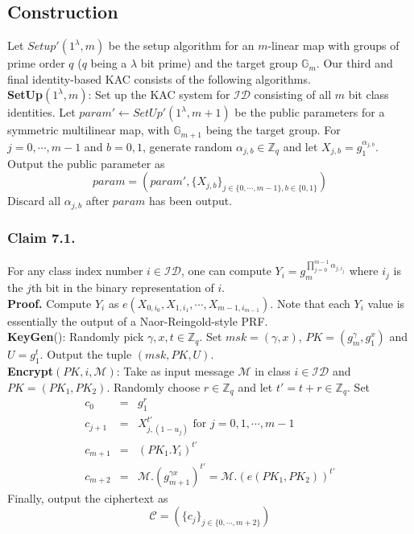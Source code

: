 \subsection{Construction}
\label{subsec:construction_third}

Let $Setup'(1^\lambda,m)$ be the setup algorithm for an $m$-linear map with groups of prime order $q$ ($q$ being a $\lambda$ bit prime) and the target group $\mathbb{G}_{m}$. Our third and final identity-based KAC consists of the following algorithms.\\

\noindent\textbf{SetUp}$(1^{\lambda},m)$: Set up the KAC system for $\mathcal{ID}$ consisting of all $m$ bit class identities. Let $param'\leftarrow SetUp'(1^{\lambda},m+1)$ be the public parameters for a symmetric multilinear map, with $\mathbb{G}_{m+1}$ being the target group. For $j=0,\cdots,m-1$ and $b=0,1$, generate random $\alpha_{j,b}\in\mathbb{Z}_q$ and let $X_{j,b}=g^{\alpha_{j,b}}_1$. Output the public parameter as
\begin{equation}
 param = (param',\{X_{j,b}\}_{j\in\{0,\cdots,m-1\},b\in\{0,1\}})\nonumber
\end{equation}
\noindent Discard all $\alpha_{j,b}$ after $param$ has been output. 

\subsubsection{Claim 7.1.} For any class index number $i\in\mathcal{ID}$, one can compute $Y_i=g^{\prod_{j=0}^{m-1}\alpha_{j,i_j}}_m$ where $i_j$ is the $j$th bit in the binary representation of $i$.\\

\noindent \textbf{Proof.} Compute $Y_i$ as $e(X_{0,i_0},X_{1,i_1},\cdots,X_{m-1,i_{m-1}})$. Note that each $Y_i$ value is essentially the output of a Naor-Reingold-style PRF.\\

\noindent \textbf{KeyGen}(): Randomly pick $\gamma,x,t \in \mathbb{Z}_q$. Set $msk=(\gamma,x)$, $PK=(g^{\gamma}_{m},g^{x}_1)$ and $U=g^{t}_{1}$. Output the tuple $(msk,PK,U)$.\\

\noindent \textbf{Encrypt}$(PK,i,\mathcal{M})$: Take as input message $\mathcal{M}$ in class $i \in \mathcal{ID}$ and $PK=(PK_1,PK_2)$. Randomly choose $r\in\mathbb{Z}_q$ and let $t'=t+r \in\mathbb{Z}_q$. Set
\begin{eqnarray}
 c_0&=&g^{r}_1 \nonumber\\
 c_{j+1}&=&X^{t'}_{j,\left(1-u_{j}\right)} \text{ for } j=0,1,\cdots,m-1\nonumber\\
 c_{m+1}&=&{\left(PK_1.Y_i\right)}^{t'}\nonumber\\
 c_{m+2}&=&\mathcal{M}.\left(g^{\gamma x}_{m+1}\right)^{t'}=\mathcal{M}.\left(e(PK_1,PK_2)\right)^{t'}\nonumber
\end{eqnarray}
\noindent Finally, output the ciphertext as 
\begin{equation}
 \mathcal{C}=(\{c_j\}_{j\in\{0,\cdots,m+2\}})\nonumber
\end{equation}

